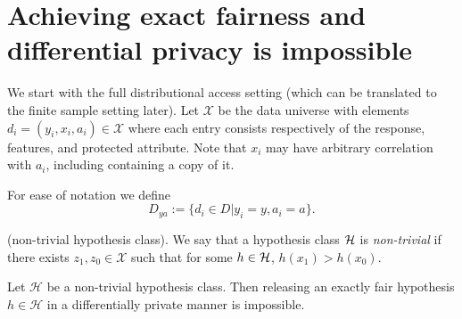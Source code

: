 \section{Achieving exact fairness and differential privacy is impossible}
We start with the full distributional access setting (which can be translated to the finite sample setting later). Let $\mathcal{X}$ be the data universe with elements $d_i = (y_i,x_i,a_i) \in \mathcal{X}$ where each entry consists respectively of the response, features, and protected attribute. Note that $x_i$ may have arbitrary correlation with $a_i$, including containing a copy of it.



\begin{defn}
	For ease of notation we define
	$$D_{ya} := \{d_i \in D | y_i = y, a_i = a \}.$$
\end{defn}
\begin{defn}
	(non-trivial hypothesis class). We say that a hypothesis class $\mathcal{H}$ is  \emph{non-trivial} if there exists $z_1, z_0 \in \mathcal{X}$ such that for some $h \in \mathcal{H}$, $h(x_1) > h(x_0)$.
\end{defn}
\begin{lemma}Let $\mathcal{H}$ be a non-trivial hypothesis class. Then
  releasing an exactly fair hypothesis $h\in \mathcal{H}$ in a
  differentially private manner is impossible.
\end{lemma}

